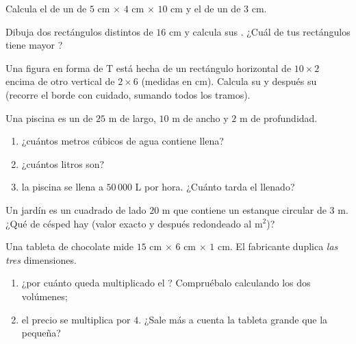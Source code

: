 \begin{exercise}[$\star$]\label{exo:g6:measure:7}
Calcula el  de un  de $5$ cm $\times$ $4$ cm $\times$ $10$ cm
y el de un  de  $3$ cm.
\end{exercise}

\begin{exercise}[$\star$]\label{exo:g6:measure:8}
Dibuja dos rectángulos distintos de  $16$ cm y calcula sus
. ¿Cuál de tus rectángulos tiene mayor ?
\end{exercise}

\begin{exercise}[$\star\star$]\label{exo:g6:measure:9}
Una figura en forma de T está hecha de un rectángulo horizontal de $10 \times 2$
encima de otro vertical de $2 \times 6$ (medidas en cm). Calcula su
 y después su  (recorre el borde con cuidado, sumando
todos los tramos).
\end{exercise}

\begin{exercise}[$\star\star$]\label{exo:g6:measure:10}
Una piscina es un  de $25$ m de largo, $10$ m de ancho y
$2$ m de profundidad.
\begin{enumerate}
  \item ¿cuántos metros cúbicos de agua contiene llena?
  \item ¿cuántos litros son?
  \item la piscina se llena a $50\,000$ L por hora. ¿Cuánto tarda el
        llenado?
\end{enumerate}
\end{exercise}

\begin{exercise}[$\star\star$]\label{exo:g6:measure:11}
Un jardín es un cuadrado de lado $20$ m que contiene un estanque circular de
 $3$ m. ¿Qué  de césped hay (valor exacto y después redondeado
al m$^2$)?
\end{exercise}

\begin{exercise}[$\star\star\star$]\label{exo:g6:measure:12}
Una tableta de chocolate mide $15$ cm $\times$ $6$ cm $\times$ $1$ cm.
El fabricante duplica \emph{las tres} dimensiones.
\begin{enumerate}
  \item ¿por cuánto queda multiplicado el ? Compruébalo calculando los dos
        volúmenes;
  \item el precio se multiplica por $4$. ¿Sale más a cuenta la tableta grande
        que la pequeña?
\end{enumerate}
\end{exercise}

